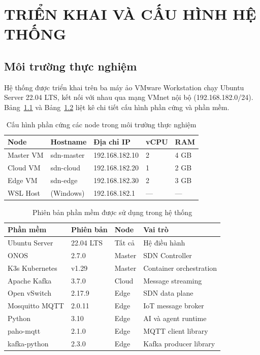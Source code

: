 \chapter{TRIỂN KHAI VÀ CẤU HÌNH HỆ THỐNG}

\section{Môi trường thực nghiệm}

Hệ thống được triển khai trên ba máy ảo VMware Workstation chạy Ubuntu Server 22.04 LTS, kết nối với nhau qua mạng VMnet nội bộ (192.168.182.0/24). Bảng~\ref{tab:env_nodes} và Bảng~\ref{tab:env_software} liệt kê chi tiết cấu hình phần cứng và phần mềm.

\begin{table}[htbp]
\caption{Cấu hình phần cứng các node trong môi trường thực nghiệm}
\label{tab:env_nodes}
\centering
\begin{tabular}{lllll}
\toprule
\textbf{Node} & \textbf{Hostname} & \textbf{Địa chỉ IP} & \textbf{vCPU} & \textbf{RAM} \\
\midrule
Master VM & sdn-master & 192.168.182.10 & 2 & 4 GB \\
Cloud VM  & sdn-cloud  & 192.168.182.20 & 1 & 2 GB \\
Edge VM   & sdn-edge   & 192.168.182.30 & 2 & 3 GB \\
WSL Host  & (Windows)  & 192.168.182.1  & — & —    \\
\bottomrule
\end{tabular}
\end{table}

\begin{table}[htbp]
\caption{Phiên bản phần mềm được sử dụng trong hệ thống}
\label{tab:env_software}
\centering
\begin{tabular}{llll}
\toprule
\textbf{Phần mềm} & \textbf{Phiên bản} & \textbf{Node} & \textbf{Vai trò} \\
\midrule
Ubuntu Server   & 22.04 LTS & Tất cả & Hệ điều hành \\
ONOS            & 2.7.0     & Master  & SDN Controller \\
K3s Kubernetes  & v1.29     & Master  & Container orchestration \\
Apache Kafka    & 3.7.0     & Cloud   & Message streaming \\
Open vSwitch    & 2.17.9    & Edge    & SDN data plane \\
Mosquitto MQTT  & 2.0.11    & Edge    & IoT message broker \\
Python          & 3.10      & Edge    & AI và agent runtime \\
paho-mqtt       & 2.1.0     & Edge    & MQTT client library \\
kafka-python    & 2.3.0     & Edge    & Kafka producer library \\
\bottomrule
\end{tabular}
\end{table}

